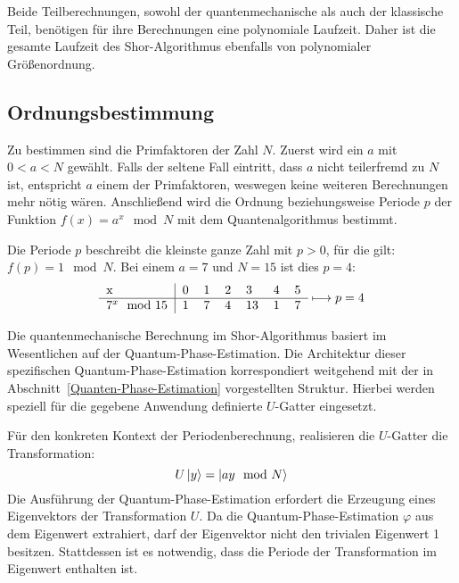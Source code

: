 Beide Teilberechnungen, sowohl der quantenmechanische als auch der klassische Teil, 
benötigen für ihre Berechnungen eine polynomiale Laufzeit. 
Daher ist die gesamte Laufzeit des Shor-Algorithmus ebenfalls von polynomialer Größenordnung.

\subsection{Ordnungsbestimmung} \label{Shor:Ordnungsbestimmung}
Zu bestimmen sind die Primfaktoren der Zahl \(N\).
Zuerst wird ein \(a\) mit \(0 < a < N\) gewählt.
Falls der seltene Fall eintritt, dass \(a\) nicht teilerfremd zu \(N\) ist, entspricht \(a\) einem der Primfaktoren, weswegen 
keine weiteren Berechnungen mehr nötig wären.
Anschließend wird die Ordnung beziehungsweise Periode \(p\) der Funktion \({f(x) = a^x \mod N}\) mit dem Quantenalgorithmus bestimmt.

Die Periode \(p\) beschreibt die kleinste ganze Zahl mit \({p > 0}\), für die gilt: \({f(p) = 1 \mod N}\).
Bei einem \(a = 7\) und \(N = 15\) ist dies \(p=4\):
\[
\begin{tabular}{l|llllll}
    x     &     0     &     1       &     2      &      3   &  4 &  5  \\ \hline
    \(7^x \mod 15\)    &      1     &        7     &       4     &     13     &  1 &  7 
\end{tabular} \longmapsto p = 4
\]

Die quantenmechanische Berechnung im Shor-Algorithmus basiert im Wesentlichen auf der Quantum-Phase-Estimation.
Die Architektur dieser spezifischen Quantum-Phase-Estimation korrespondiert weitgehend mit der in Abschnitt~\ref{Quanten-Phase-Estimation} vorgestellten Struktur.
Hierbei werden speziell für die gegebene Anwendung definierte \(U\)-Gatter eingesetzt.

Für den konkreten Kontext der Periodenberechnung, realisieren die \(U\)-Gatter die Transformation:
\[U\ket{y} = \ket{ay \mod N}\] 
Die Ausführung der Quantum-Phase-Estimation erfordert die Erzeugung eines Eigenvektors der Transformation \(U\).
Da die Quantum-Phase-Estimation \(\varphi\) aus dem Eigenwert extrahiert, 
darf der Eigenvektor nicht den trivialen Eigenwert 1 besitzen.
Stattdessen ist es notwendig, dass die Periode der Transformation im Eigenwert enthalten ist.

